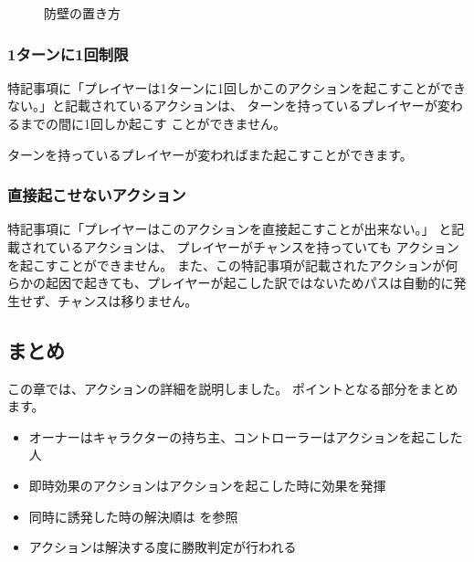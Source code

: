 \documentclass[letterpaper,10pt,dvipdfmx]{sphinxmanual}
\begin{document}
\begin{figure}[htbp]
\centering
\capstart

\noindent{}
\caption{防壁の置き方}\label{\detokenize{common/05-action_detail:id18}}\label{\detokenize{common/05-action_detail:set-bulwork}}\end{figure}


\subsubsection{1ターンに1回制限}
\label{\detokenize{common/05-action_detail:id14}}
特記事項に「プレイヤーは1ターンに1回しかこのアクションを起こすことができない。」と記載されているアクションは、
ターンを持っているプレイヤーが変わるまでの間に1回しか起こす
ことができません。

ターンを持っているプレイヤーが変わればまた起こすことができます。


\subsubsection{直接起こせないアクション}
\label{\detokenize{common/05-action_detail:id15}}
特記事項に「プレイヤーはこのアクションを直接起こすことが出来ない。」
と記載されているアクションは、
プレイヤーがチャンスを持っていても
アクションを起こすことができません。
また、この特記事項が記載されたアクションが何らかの起因で起きても、プレイヤーが起こした訳ではないためパスは自動的に発生せず、チャンスは移りません。


\subsection{まとめ}
\label{\detokenize{common/05-action_detail:id16}}
この章では、アクションの詳細を説明しました。
ポイントとなる部分をまとめます。
\begin{itemize}
\item {} 
オーナーはキャラクターの持ち主、コントローラーはアクションを起こした人

\item {} 
即時効果のアクションはアクションを起こした時に効果を発揮

\item {} 
同時に誘発した時の解決順は {\hyperref[\detokenize{common/05-action_detail:action-resolves}]{}} を参照

\item {} 
アクションは解決する度に勝敗判定が行われる

\end{itemize}
\end{document}
